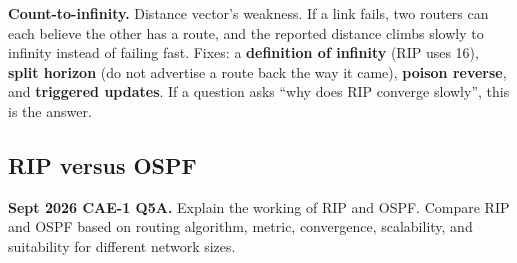 \documentclass[11pt,a4paper]{article}
\begin{document}
\begin{dangerbox}
\textbf{Count-to-infinity.} Distance vector's weakness. If a link fails, two routers can each believe the other has a route, and the reported distance climbs slowly to infinity instead of failing fast. Fixes: a \textbf{definition of infinity} (RIP uses 16), \textbf{split horizon} (do not advertise a route back the way it came), \textbf{poison reverse}, and \textbf{triggered updates}. If a question asks ``why does RIP converge slowly'', this is the answer.
\end{dangerbox}

\subsection{RIP versus OSPF}

\begin{pyqbox}
\textbf{Sept 2026 CAE-1 Q5A.} Explain the working of RIP and OSPF. Compare RIP and OSPF based on routing algorithm, metric, convergence, scalability, and suitability for different network sizes.
\end{pyqbox}
\end{document}
